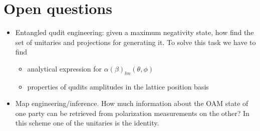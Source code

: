 \documentclass[
	aps, pra,
	superscriptaddress, twocolumn,
	floatfix,
	10pt
]{revtex4-1}
\begin{document}
\section{Open questions}
\begin{itemize}
    \item Entangled qudit engineering: given a maximum negativity state, how find the set of unitaries and projections for generating it. To solve this task we have to find
    \begin{itemize}
        \item analytical expression for $\alpha(\beta)_{lm}(\theta, \phi)$
        \item properties of qudits amplitudes in the lattice position basis
    \end{itemize}
    \item Map engineering/inference. How much information about the OAM state of one party can be retrieved from polarization measurements on the other? In this scheme one of the unitaries is the identity.
\end{itemize}



\end{document}
